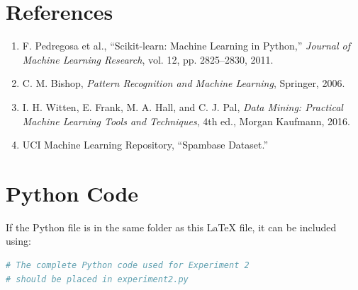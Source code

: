 \documentclass[12pt,a4paper]{article}
\begin{document}
\section{References}

\begin{enumerate}

\item F. Pedregosa et al., ``Scikit-learn: Machine Learning in Python,'' 
\textit{Journal of Machine Learning Research}, vol. 12, pp. 2825--2830, 2011.

\item C. M. Bishop, 
\textit{Pattern Recognition and Machine Learning},
Springer, 2006.

\item I. H. Witten, E. Frank, M. A. Hall, and C. J. Pal,
\textit{Data Mining: Practical Machine Learning Tools and Techniques},
4th ed., Morgan Kaufmann, 2016.

\item UCI Machine Learning Repository, ``Spambase Dataset.''

\end{enumerate}


\appendix

\section{Python Code}

If the Python file is in the same folder as this LaTeX file, it can be included using:

\begin{lstlisting}[language=Python]
# The complete Python code used for Experiment 2
# should be placed in experiment2.py
\end{lstlisting}


\end{document}
